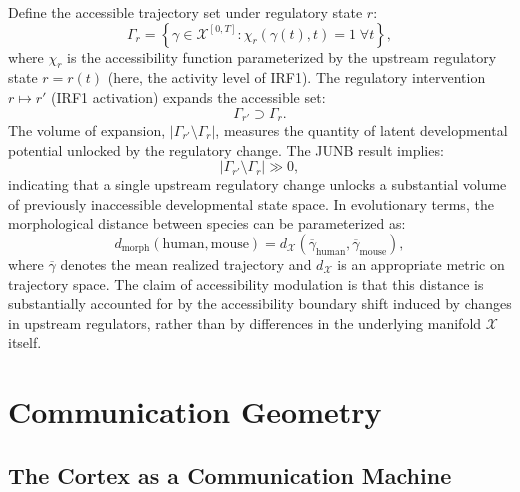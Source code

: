 \documentclass[12pt, a4paper, openany]{book}
\theoremstyle{definition}
\theoremstyle{remark}
\begin{document}
Define the accessible trajectory set under regulatory state $r$:
\begin{equation}
\Gamma_r = \left\{ \gamma \in \mathcal{X}^{[0,T]} : \chi_r(\gamma(t), t) = 1 \;\forall t \right\},
\end{equation}
where $\chi_r$ is the accessibility function parameterized by the upstream regulatory state $r = r(t)$ (here, the activity level of IRF1). The regulatory intervention $r \mapsto r'$ (IRF1 activation) expands the accessible set:
\begin{equation}
\Gamma_{r'} \supset \Gamma_r.
\end{equation}
The volume of expansion, $|\Gamma_{r'} \setminus \Gamma_r|$, measures the quantity of latent developmental potential unlocked by the regulatory change. The JUNB result implies:
\begin{equation}
|\Gamma_{r'} \setminus \Gamma_r| \gg 0,
\end{equation}
indicating that a single upstream regulatory change unlocks a substantial volume of previously inaccessible developmental state space. In evolutionary terms, the morphological distance between species can be parameterized as:
\begin{equation}
d_{\text{morph}}(\text{human}, \text{mouse}) = d_{\mathcal{X}}\!\left(\overline{\gamma}_{\text{human}}, \overline{\gamma}_{\text{mouse}}\right),
\end{equation}
where $\overline{\gamma}$ denotes the mean realized trajectory and $d_{\mathcal{X}}$ is an appropriate metric on trajectory space. The claim of accessibility modulation is that this distance is substantially accounted for by the accessibility boundary shift induced by changes in upstream regulators, rather than by differences in the underlying manifold $\mathcal{X}$ itself.


\part{Communication Geometry}


\chapter{The Cortex as a Communication Machine}
\end{document}
